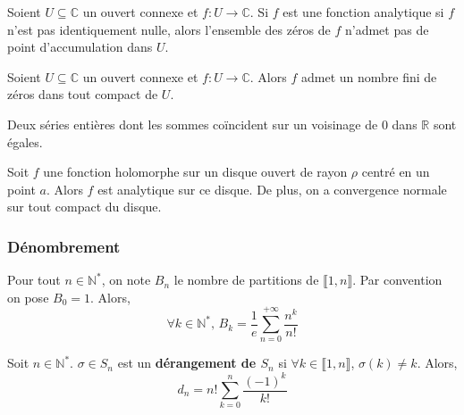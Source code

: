 	\begin{theorem}
		Soient $U \subseteq \mathbb{C}$ un ouvert connexe et $f : U \rightarrow \mathbb{C}$. Si $f$ est une fonction analytique si $f$ n'est pas identiquement nulle, alors l'ensemble des zéros de $f$ n'admet pas de point d'accumulation dans $U$.
	\end{theorem}
	
	\begin{corollary}
		Soient $U \subseteq \mathbb{C}$ un ouvert connexe et $f : U \rightarrow \mathbb{C}$. Alors $f$ admet un nombre fini de zéros dans tout compact de $U$.
	\end{corollary}
	
	
	\begin{corollary}
		Deux séries entières dont les sommes coïncident sur un voisinage de $0$ dans $\mathbb{R}$ sont égales.
	\end{corollary}
	
	
	\begin{theorem}
		Soit $f$ une fonction holomorphe sur un disque ouvert de rayon $\rho$ centré en un point $a$. Alors $f$ est analytique sur ce disque.
		De plus, on a convergence normale sur tout compact du disque.
	\end{theorem}

	\subsubsection{Dénombrement}
	
	
	\begin{application}
		Pour tout $n \in \mathbb{N}^*$, on note $B_n$ le nombre de partitions de $\llbracket 1, n \rrbracket$. Par convention on pose $B_0 = 1$. Alors,
		\[ \forall k \in \mathbb{N}^*, \, B_k = \frac{1}{e} \sum_{n=0}^{+\infty} \frac{n^k}{n!} \]
	\end{application}
	
	
	\begin{application}
		Soit $n \in \mathbb{N}^*$. $\sigma \in S_n$ est un \textbf{dérangement de $S_n$} si $\forall k \in \llbracket 1, n \rrbracket$, $\sigma(k) \neq k$.
		Alors,
		\[ d_n = n! \sum_{k=0}^n \frac{(-1)^k}{k!} \]
	\end{application}
	
